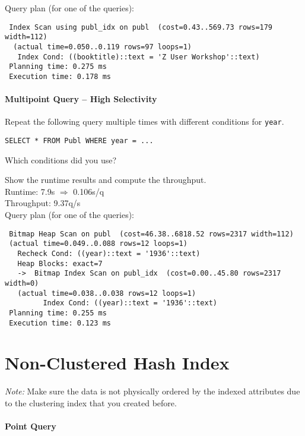 \documentclass[11pt]{scrartcl}
\begin{document}
\smallskip\noindent
Query plan (for one of the queries):
{\small
\begin{verbatim}
 Index Scan using publ_idx on publ  (cost=0.43..569.73 rows=179 width=112)
  (actual time=0.050..0.119 rows=97 loops=1)
   Index Cond: ((booktitle)::text = 'Z User Workshop'::text)
 Planning time: 0.275 ms
 Execution time: 0.178 ms
\end{verbatim}
}


\paragraph{Multipoint Query -- High Selectivity}

Repeat the following query multiple times with different conditions for {\tt year}.

{\small
\begin{verbatim}
SELECT * FROM Publ WHERE year = ...
\end{verbatim}
}

\noindent
Which conditions did you use?\\
\condC

\smallskip\noindent
Show the runtime results and compute the throughput.\\
Runtime: 7.9s $\Rightarrow$ 0.106s/q\\
Throughput: 9.37q/s\\

\smallskip\noindent
Query plan (for one of the queries):
{\small
\begin{verbatim}
 Bitmap Heap Scan on publ  (cost=46.38..6818.52 rows=2317 width=112)
 (actual time=0.049..0.088 rows=12 loops=1)
   Recheck Cond: ((year)::text = '1936'::text)
   Heap Blocks: exact=7
   ->  Bitmap Index Scan on publ_idx  (cost=0.00..45.80 rows=2317 width=0)
   (actual time=0.038..0.038 rows=12 loops=1)
         Index Cond: ((year)::text = '1936'::text)
 Planning time: 0.255 ms
 Execution time: 0.123 ms

\end{verbatim}
}

\section{Non-Clustered Hash Index}

\noindent \emph{Note:} Make sure the data is not physically ordered by
the indexed attributes due to the clustering index that you created
before.

\paragraph{Point Query}
\end{document}
